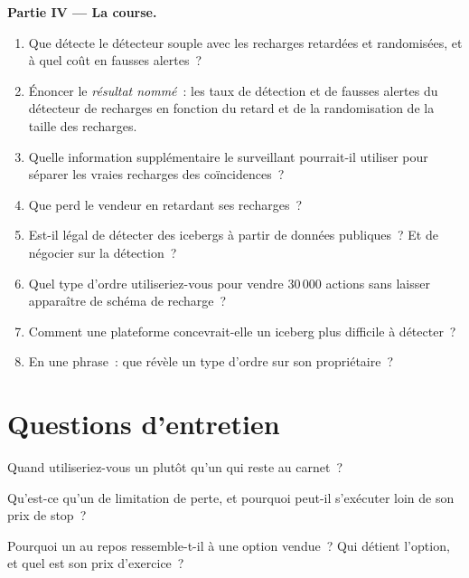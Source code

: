 \begin{problem}
\medskip\noindent\textbf{Partie IV --- La course.}
\begin{enumerate}[resume]
\item Que détecte le détecteur souple avec les recharges retardées et randomisées, et à quel coût en fausses alertes~?
\item Énoncer le \emph{résultat nommé}~: les taux de détection et de fausses alertes du détecteur de recharges en fonction du retard et de la randomisation de la taille des recharges.
\item Quelle information supplémentaire le surveillant pourrait-il utiliser pour séparer les vraies recharges des coïncidences~?
\item Que perd le vendeur en retardant ses recharges~?
\item Est-il légal de détecter des icebergs à partir de données publiques~? Et de négocier sur la détection~?
\item Quel type d'ordre utiliseriez-vous pour vendre 30\,000 actions sans laisser apparaître de schéma de recharge~?
\item Comment une plateforme concevrait-elle un iceberg plus difficile à détecter~?
\item En une phrase~: que révèle un type d'ordre sur son propriétaire~?
\end{enumerate}
\end{problem}

\section{Questions d'entretien}

\begin{interviewq}\label{iq:mx:order-types-and-their-uses:1}
Quand utiliseriez-vous un  plutôt qu'un  qui reste au carnet~?
\end{interviewq}

\begin{interviewq}\label{iq:mx:order-types-and-their-uses:2}
Qu'est-ce qu'un  de limitation de perte, et pourquoi peut-il s'exécuter loin de son prix de stop~?
\end{interviewq}

\begin{interviewq}\label{iq:mx:order-types-and-their-uses:3}
Pourquoi un  au repos ressemble-t-il à une option vendue~? Qui détient l'option, et quel est son prix d'exercice~?
\end{interviewq}

